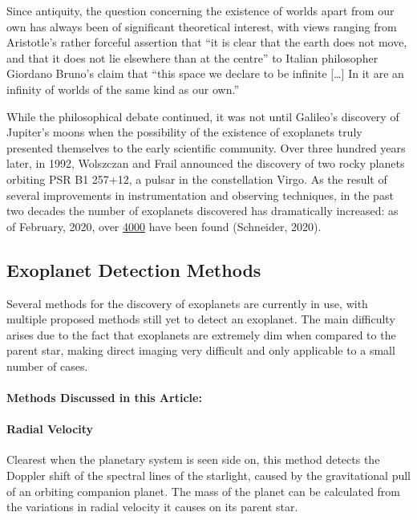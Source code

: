 \documentclass[11pt]{article}
\begin{document}
Since antiquity, the question concerning the existence of worlds apart
from our own has always been of significant theoretical interest, with
views ranging from Aristotle's rather forceful assertion that ``it is
clear that the earth does not move, and that it does not lie elsewhere
than at the centre'' to Italian philosopher Giordano Bruno's claim that
``this space we declare to be infinite {[}\ldots{]} In it are an
infinity of worlds of the same kind as our own.''

While the philosophical debate continued, it was not until Galileo's
discovery of Jupiter's moons when the possibility of the existence of
exoplanets truly presented themselves to the early scientific community.
Over three hundred years later, in 1992, Wolszczan and Frail announced
the discovery of two rocky planets orbiting PSR B1 257+12, a pulsar in
the constellation Virgo. As the result of several improvements in
instrumentation and observing techniques, in the past two decades the
number of exoplanets discovered has dramatically increased: as of
February, 2020, over \href{http://exoplanet.eu/catalog/}{4000} have been
found (Schneider, 2020).

    \hypertarget{exoplanet-detection-methods}{%
\subsection{Exoplanet Detection Methods}\label{exoplanet-detection-methods}}

Several methods for the discovery of exoplanets are currently in use,
with multiple proposed methods still yet to detect an exoplanet. The
main difficulty arises due to the fact that exoplanets are extremely dim
when compared to the parent star, making direct imaging very difficult
and only applicable to a small number of cases.

\hypertarget{methods-discussed-in-this-article}{%
\paragraph{Methods Discussed in this Article:}\label{methods-discussed-in-this-article}}

\hypertarget{radial-velocity}{%
\paragraph{Radial Velocity}\label{radial-velocity}}

Clearest when the planetary system is seen side on, this method detects
the Doppler shift of the spectral lines of the starlight, caused by the
gravitational pull of an orbiting companion planet. The mass of the
planet can be calculated from the variations in radial velocity it
causes on its parent star.
\end{document}
